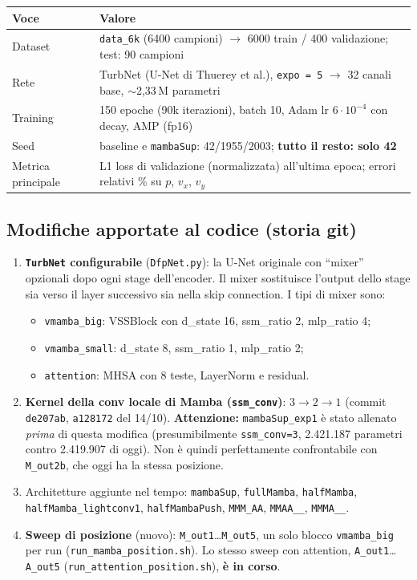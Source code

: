 \documentclass[11pt,a4paper]{article}
\newcommand{\cfg}[1]{\texttt{#1}}
\begin{document}
\begin{table}[h]
\centering
\begin{tabular}{@{}ll@{}}
\toprule
Voce & Valore \\
\midrule
Dataset & \cfg{data\_6k} (6400 campioni) $\rightarrow$ 6000 train / 400 validazione; test: 90 campioni \\
Rete & TurbNet (U-Net di Thuerey et al.), \cfg{expo = 5} $\rightarrow$ 32 canali base, $\sim$2,33\,M parametri \\
Training & 150 epoche (90k iterazioni), batch 10, Adam lr $6\cdot10^{-4}$ con decay, AMP (fp16) \\
Seed & baseline e \cfg{mambaSup}: 42/1955/2003; \textbf{tutto il resto: solo 42} \\
Metrica principale & L1 loss di validazione (normalizzata) all'ultima epoca; errori relativi \% su $p$, $v_x$, $v_y$ \\
\bottomrule
\end{tabular}
\end{table}

\subsection*{Modifiche apportate al codice (storia git)}

\begin{enumerate}
  \item \textbf{\cfg{TurbNet} configurabile} (\cfg{DfpNet.py}): la U-Net originale con ``mixer'' opzionali dopo ogni stage dell'encoder. Il mixer sostituisce l'output dello stage sia verso il layer successivo sia nella skip connection. I tipi di mixer sono:
  \begin{itemize}
    \item \cfg{vmamba\_big}: VSSBlock con d\_state 16, ssm\_ratio 2, mlp\_ratio 4;
    \item \cfg{vmamba\_small}: d\_state 8, ssm\_ratio 1, mlp\_ratio 2;
    \item \cfg{attention}: MHSA con 8 teste, LayerNorm e residual.
  \end{itemize}
  \item \textbf{Kernel della conv locale di Mamba (\cfg{ssm\_conv})}: $3 \rightarrow 2 \rightarrow 1$ (commit \cfg{de207ab}, \cfg{a128172} del 14/10). \textbf{Attenzione:} \cfg{mambaSup\_exp1} è stato allenato \emph{prima} di questa modifica (presumibilmente \cfg{ssm\_conv=3}, 2.421.187 parametri contro 2.419.907 di oggi). Non è quindi perfettamente confrontabile con \cfg{M\_out2b}, che oggi ha la stessa posizione.
  \item Architetture aggiunte nel tempo: \cfg{mambaSup}, \cfg{fullMamba}, \cfg{halfMamba}, \cfg{halfMamba\_lightconv1}, \cfg{halfMambaPush}, \cfg{MMM\_AA}, \cfg{MMAA\_\_}, \cfg{MMMA\_\_}.
  \item \textbf{Sweep di posizione} (nuovo): \cfg{M\_out1}\dots\cfg{M\_out5}, un solo blocco \cfg{vmamba\_big} per run (\cfg{run\_mamba\_position.sh}). Lo stesso sweep con attention, \cfg{A\_out1}\dots\cfg{A\_out5} (\cfg{run\_attention\_position.sh}), \textbf{è in corso}.
\end{enumerate}
\end{document}
